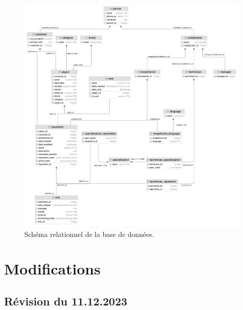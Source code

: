 \documentclass{article}
\begin{document}
\begin{figure}[!htb]
        \centering
        \includegraphics[width=1\textwidth]{../assets/diagramme-relationnel.png}
        \caption{Schéma relationnel de la base de données.}
\end{figure}

\section{Modifications}

\subsection*{Révision du 11.12.2023}
\end{document}
